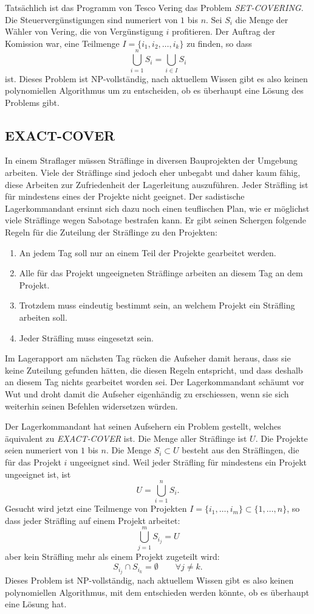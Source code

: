 \medskip

Tatsächlich ist das Programm von Tesco Vering das Problem {\it SET-COVERING}.
Die Steuervergünstigungen sind numeriert von $1$ bis $n$.
Sei $S_i$ die Menge der Wähler von Vering, die von Vergünstigung $i$
profitieren. Der Auftrag der Komission war, eine Teilmenge
$I=\{i_1,i_2,\dots,i_k\}$ zu finden, so dass
\[
\bigcup_{i=1}^nS_i=\bigcup_{i\in I}S_i
\]
ist.
Dieses Problem ist NP-vollständig, nach aktuellem Wissen gibt
es also keinen polynomiellen Algorithmus um zu entscheiden, ob es
überhaupt eine Lösung des Problems gibt.

\subsection{EXACT-COVER}
In einem Straflager müssen Sträflinge in diversen Bauprojekten
der Umgebung arbeiten.
Viele der Sträflinge sind jedoch eher unbegabt und daher kaum
fähig, diese Arbeiten zur Zufriedenheit der Lagerleitung auszuführen.
Jeder Sträfling ist für mindestens eines der Projekte nicht geeignet.
Der sadistische Lagerkommandant ersinnt sich dazu noch einen teuflischen
Plan, wie er möglichst viele Sträflinge wegen Sabotage bestrafen kann.
Er gibt seinen Schergen folgende Regeln für die Zuteilung der Sträflinge
zu den Projekten:
\begin{enumerate}
\item
An jedem Tag soll nur an einem Teil der Projekte gearbeitet werden.
\item
Alle für das Projekt ungeeigneten Sträflinge arbeiten an diesem Tag
an dem Projekt.
\item
Trotzdem muss eindeutig bestimmt sein, an welchem Projekt ein Sträfling
arbeiten soll.
\item
Jeder Sträfling muss eingesetzt sein.
\end{enumerate}
Im Lagerapport am nächsten Tag rücken die Aufseher damit heraus, dass
sie keine Zuteilung gefunden hätten, die diesen Regeln entspricht, und
dass deshalb an diesem Tag nichts gearbeitet worden sei.
Der Lagerkommandant schäumt vor Wut und droht damit die Aufseher eigenhändig
zu erschiessen, wenn sie sich weiterhin seinen Befehlen widersetzen
würden.

\medskip

Der Lagerkommandant hat seinen Aufsehern ein Problem gestellt, welches
äquivalent zu {\it EXACT-COVER} ist.
Die Menge aller Sträflinge ist $U$.
Die Projekte seien numeriert
von $1$ bis $n$. Die Menge $S_i\subset U$ besteht aus den Sträflingen, die
für das Projekt $i$ ungeeignet sind. Weil jeder Sträfling für mindestens
ein Projekt ungeeignet ist, ist 
\[
U=\bigcup_{i=1}^n S_i.
\]
Gesucht wird jetzt eine Teilmenge von Projekten
$I=\{i_1,\dots,i_m\}\subset\{1,\dots,n\}$, so dass 
jeder Sträfling auf einem Projekt arbeitet:
\[
\bigcup_{j=1}^m S_{i_j}=U
\]
aber kein Sträfling mehr als einem Projekt zugeteilt wird:
\[
S_{i_j}\cap S_{i_k}=\emptyset\qquad \forall j\ne k.
\]
Dieses Problem ist NP-vollständig, nach aktuellem Wissen gibt es
also keinen polynomiellen Algorithmus, mit dem entschieden werden
könnte, ob es überhaupt eine Lösung hat.

